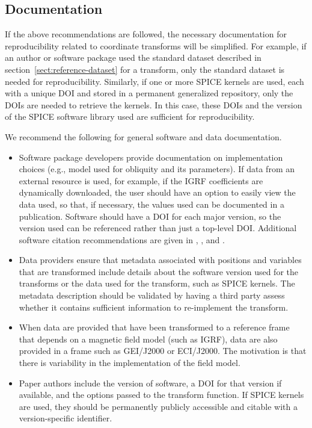 \documentclass[draft]{agujournal2019}
\begin{document}
\subsection{Documentation}

If the above recommendations are followed, the necessary documentation for reproducibility related to coordinate transforms will be simplified. For example, if an author or software package used the standard dataset described in section~\ref{sect:reference-dataset} for a transform, only the standard dataset is needed for reproducibility. Similarly, if one or more SPICE kernels are used, each with a unique DOI and stored in a permanent generalized repository, only the DOIs are needed to retrieve the kernels. In this case, these DOIs and the version of the SPICE software library used are sufficient for reproducibility.

We recommend the following for general software and data documentation.

\begin{itemize}
  \item Software package developers provide documentation on implementation choices (e.g., model used for obliquity and its parameters). If data from an external resource is used, for example, if the IGRF coefficients are dynamically downloaded, the user should have an option to easily view the data used, so that, if necessary, the values used can be documented in a publication.
  Software should have a DOI for each major version, so the version used can be referenced rather than just a top-level DOI. Additional software citation recommendations are given in , , and .

  \item Data providers ensure that metadata associated with positions and variables that are transformed include details about the software version used for the transforms or the data used for the transform, such as SPICE kernels. The metadata description should be validated by having a third party assess whether it contains sufficient information to re-implement the transform.

  \item When data are provided that have been transformed to a reference frame that depends on a magnetic field model (such as IGRF), data are also provided in a frame such as GEI/J2000 or ECI/J2000. The motivation is that there is variability in the implementation of the field model. 
  
  \item Paper authors include the version of software, a DOI for that version if available, and the options passed to the transform function. If SPICE kernels are used, they should be permanently publicly accessible and citable with a version-specific identifier. 

\end{itemize}
\end{document}
